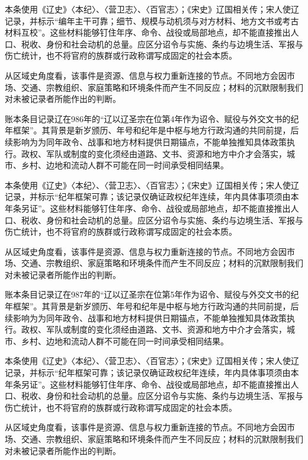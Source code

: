 本条使用《辽史》〈本纪〉、〈营卫志〉、〈百官志〉；《宋史》辽国相关传；宋人使辽记录，并标示“编年主干可靠；细节、规模与动机须与对方材料、地方文书或考古材料互校”。这些材料能够钉住年序、命令、战役或局部地点，却不能直接推出人口、税收、身份和社会动机的总量。应区分诏令与实施、条约与边境生活、军报与伤亡统计，也不将官府的族群或行政称谓写成固定的社会本质。

从区域史角度看，该事件是资源、信息与权力重新连接的节点。不同地方会因市场、交通、宗教组织、家庭策略和环境条件而产生不同反应；材料的沉默限制我们对未被记录者所能作出的判断。

账本条目记录辽在986年的“辽以辽圣宗在位第4年作为诏令、赋役与外交文书的纪年框架”。其背景是新岁颁历、年号和纪年是中枢与地方行政沟通的共同前提，后续影响为为同年政令、战事和地方材料提供日期锚点，不能单独推知具体政策执行。政权、军队或制度的变化须经由道路、文书、资源和地方中介才会落实，城市、乡村、边地和流动人群不可能在同一时间承受相同结果。

本条使用《辽史》〈本纪〉、〈营卫志〉、〈百官志〉；《宋史》辽国相关传；宋人使辽记录，并标示“纪年框架可靠；该记录仅确证政权纪年连续，年内具体事项须由本年条另证”。这些材料能够钉住年序、命令、战役或局部地点，却不能直接推出人口、税收、身份和社会动机的总量。应区分诏令与实施、条约与边境生活、军报与伤亡统计，也不将官府的族群或行政称谓写成固定的社会本质。

从区域史角度看，该事件是资源、信息与权力重新连接的节点。不同地方会因市场、交通、宗教组织、家庭策略和环境条件而产生不同反应；材料的沉默限制我们对未被记录者所能作出的判断。

账本条目记录辽在987年的“辽以辽圣宗在位第5年作为诏令、赋役与外交文书的纪年框架”。其背景是新岁颁历、年号和纪年是中枢与地方行政沟通的共同前提，后续影响为为同年政令、战事和地方材料提供日期锚点，不能单独推知具体政策执行。政权、军队或制度的变化须经由道路、文书、资源和地方中介才会落实，城市、乡村、边地和流动人群不可能在同一时间承受相同结果。

本条使用《辽史》〈本纪〉、〈营卫志〉、〈百官志〉；《宋史》辽国相关传；宋人使辽记录，并标示“纪年框架可靠；该记录仅确证政权纪年连续，年内具体事项须由本年条另证”。这些材料能够钉住年序、命令、战役或局部地点，却不能直接推出人口、税收、身份和社会动机的总量。应区分诏令与实施、条约与边境生活、军报与伤亡统计，也不将官府的族群或行政称谓写成固定的社会本质。

从区域史角度看，该事件是资源、信息与权力重新连接的节点。不同地方会因市场、交通、宗教组织、家庭策略和环境条件而产生不同反应；材料的沉默限制我们对未被记录者所能作出的判断。

